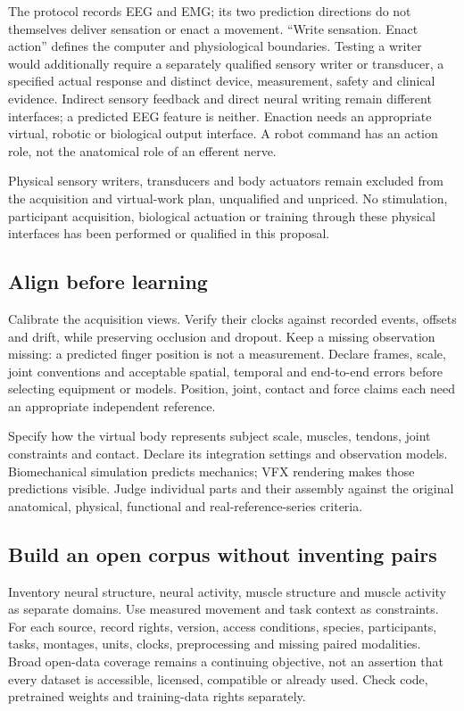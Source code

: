 The protocol records EEG and EMG; its two prediction directions do not themselves deliver sensation or enact a movement. ``Write sensation. Enact action'' defines the computer and physiological boundaries. Testing a writer would additionally require a separately qualified sensory writer or transducer, a specified actual response and distinct device, measurement, safety and clinical evidence. Indirect sensory feedback and direct neural writing remain different interfaces; a predicted EEG feature is neither. Enaction needs an appropriate virtual, robotic or biological output interface. A robot command has an action role, not the anatomical role of an efferent nerve.

Physical sensory writers, transducers and body actuators remain excluded from the acquisition and virtual-work plan, unqualified and unpriced. No stimulation, participant acquisition, biological actuation or training through these physical interfaces has been performed or qualified in this proposal.

\subsection{Align before learning}

Calibrate the acquisition views. Verify their clocks against recorded events,
offsets and drift, while preserving occlusion and dropout. Keep a missing
observation missing: a predicted finger position is not a measurement. Declare
frames, scale, joint conventions and acceptable spatial, temporal and end-to-end
errors before selecting equipment or models. Position, joint, contact and force
claims each need an appropriate independent reference.

Specify how the virtual body represents subject scale, muscles, tendons, joint
constraints and contact. Declare its integration settings and observation
models. Biomechanical simulation predicts mechanics; VFX rendering makes those
predictions visible. Judge individual parts and their assembly against the
original anatomical, physical, functional and real-reference-series criteria.

\subsection{Build an open corpus without inventing pairs}

Inventory neural structure, neural activity, muscle structure and muscle
activity as separate domains. Use measured movement and task context as
constraints. For each source, record rights, version, access conditions,
species, participants, tasks, montages, units, clocks, preprocessing and missing
paired modalities. Broad open-data coverage remains a continuing objective,
not an assertion that every dataset is accessible, licensed, compatible or
already used. Check code, pretrained weights and training-data rights separately.

